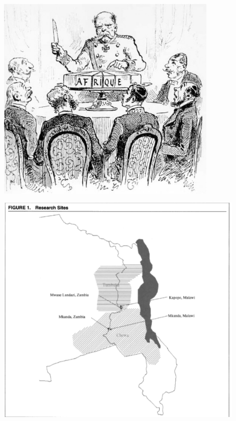 \documentclass[xcolor=x11names,compress]{beamer}\usepackage[]{graphicx}\usepackage[]{color}
\renewcommand{\(}{\begin{columns}}
\renewcommand{\)}{\end{columns}}
\newcommand{\<}[1]{\begin{column}{#1}}
\renewcommand{\>}{\end{column}}
\begin{document}
\begin{frame}
\includegraphics[width=0.8\textwidth]{Arbitrary_borders.jpg}
\end{frame}

\begin{frame}
\includegraphics[width=0.9\textwidth]{Posner_map.png}
\end{frame}
\end{document}
